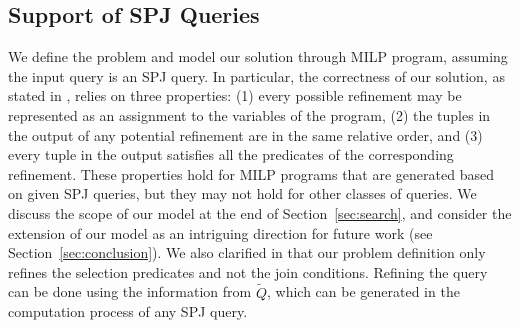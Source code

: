 \documentclass[main.tex]{subfile}
\begin{document}
\subsection*{Support of SPJ Queries}
We define the problem and model our solution through MILP program, assuming the input query is an SPJ query. In particular, the correctness of our solution, as stated in , relies on three properties: (1) every possible refinement may be represented as an assignment to the variables of the program, (2) the tuples in the output of any potential refinement are in the same relative order, and (3) every tuple in the output satisfies all the predicates of the corresponding refinement. These properties hold for MILP programs that are generated based on given SPJ queries, but they may not hold for other classes of queries. We discuss the scope of our model at the end of Section~\ref{sec:search}, and consider the extension of our model as an intriguing direction for future work (see Section~\ref{sec:conclusion}). We also clarified in  that our problem definition only refines the selection predicates and not the join conditions. Refining the query can be done using the information from $\widetilde{Q}$, which can be generated in the computation process of any SPJ query.

\end{document}

